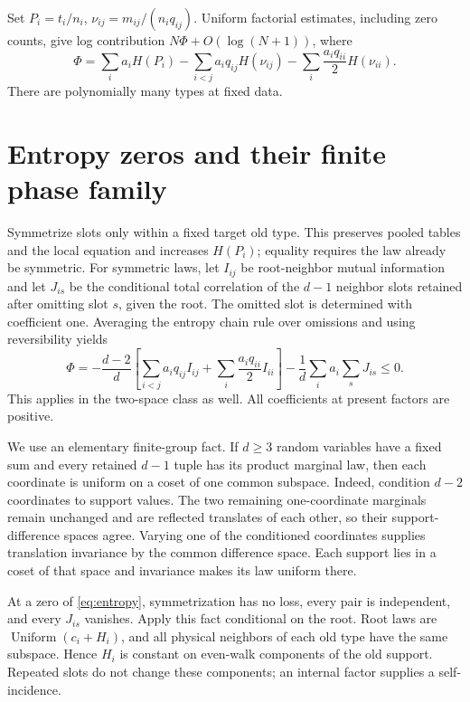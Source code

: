 \documentclass[11pt]{article}
\begin{document}
Set $P_i=t_i/n_i$, $\nu_{ij}=m_{ij}/(n_iq_{ij})$. Uniform factorial estimates, including zero counts, give log contribution $N\Phi+O(\log(N+1))$, where
\begin{equation}\label{eq:entropy}
 \Phi=\sum_i a_iH(P_i)-\sum_{i<j}a_iq_{ij}H(\nu_{ij})
                         -\sum_i\frac{a_iq_{ii}}2H(\nu_{ii}).
\end{equation}
There are polynomially many types at fixed data.

\section{Entropy zeros and their finite phase family}
Symmetrize slots only within a fixed target old type. This preserves pooled tables and the local equation and increases $H(P_i)$; equality requires the law already be symmetric. For symmetric laws, let $I_{ij}$ be root-neighbor mutual information and let $J_{is}$ be the conditional total correlation of the $d-1$ neighbor slots retained after omitting slot $s$, given the root. The omitted slot is determined with coefficient one. Averaging the entropy chain rule over omissions and using reversibility yields
\begin{equation}\label{eq:allslot}
 \Phi=-\frac{d-2}{d}\left[\sum_{i<j}a_iq_{ij}I_{ij}
                    +\sum_i\frac{a_iq_{ii}}2 I_{ii}\right]
       -\frac1d\sum_i a_i\sum_sJ_{is}\le0.
\end{equation}
This applies in the two-space class as well. All coefficients at present factors are positive.

We use an elementary finite-group fact. If $d\ge3$ random variables have a fixed sum and every retained $d-1$ tuple has its product marginal law, then each coordinate is uniform on a coset of one common subspace. Indeed, condition $d-2$ coordinates to support values. The two remaining one-coordinate marginals remain unchanged and are reflected translates of each other, so their support-difference spaces agree. Varying one of the conditioned coordinates supplies translation invariance by the common difference space. Each support lies in a coset of that space and invariance makes its law uniform there.

At a zero of \eqref{eq:entropy}, symmetrization has no loss, every pair is independent, and every $J_{is}$ vanishes. Apply this fact conditional on the root. Root laws are $\operatorname{Uniform}(c_i+H_i)$, and all physical neighbors of each old type have the same subspace. Hence $H_i$ is constant on even-walk components of the old support. Repeated slots do not change these components; an internal factor supplies a self-incidence.
\end{document}
